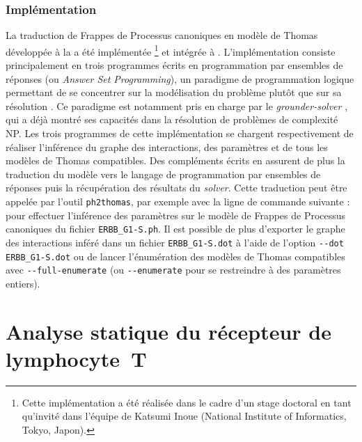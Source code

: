 
\subsubsection*{Implémentation}

La traduction de Frappes de Processus canoniques en modèle de Thomas développée
à la  a été implémentée%
\footnote{Cette implémentation a été réalisée dans le cadre d'un stage doctoral
en tant qu'invité dans l'équipe de
Katsumi Inoue (National Institute of Informatics, Tokyo, Japon).}
et intégrée à \Pint.
L'implémentation consiste principalement en trois programmes
écrits en programmation par ensembles de réponses
(ou \textit{Answer Set Programming}),
un paradigme de programmation logique permettant de se concentrer sur la modélisation
du problème plutôt que sur sa résolution \cite{Baral03}.
Ce paradigme est notamment pris en charge par le \textit{grounder-solver} 
\cite{gekakasc14b},
qui a déjà montré ses capacités dans la résolution de problèmes de complexité NP.
Les trois programmes de cette implémentation se chargent respectivement
de réaliser l'inférence
du graphe des interactions, des paramètres et de tous les modèles de Thomas compatibles.
Des compléments écrits en  assurent de plus la traduction du modèle vers
le langage de programmation par ensembles de réponses
puis la récupération des résultats du \textit{solver}.
Cette traduction peut être appelée par l'outil \texttt{ph2thomas}, par exemple avec la
ligne de commande suivante :
pour effectuer l'inférence des paramètres sur le modèle de Frappes de Processus canoniques
du fichier \texttt{ERBB\_G1-S.ph}.
Il est possible de plus d'exporter le graphe des interactions inféré dans un fichier
\texttt{ERBB\_G1-S.dot} à l'aide de l'option \texttt{-{}-dot ERBB\_G1-S.dot}
ou de lancer l'énumération des modèles de Thomas compatibles
avec \texttt{-{}-full-enumerate} (ou \texttt{-{}-enumerate} pour se restreindre
à des paramètres entiers).




\section{Analyse statique du récepteur de lymphocyte~T}

